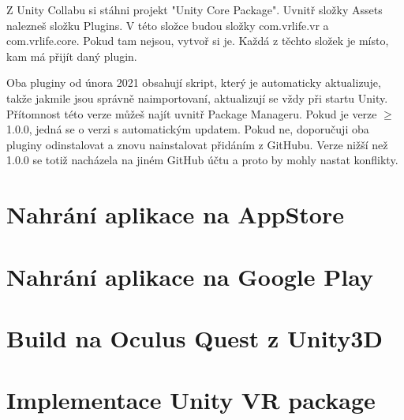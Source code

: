\documentclass{article}
\begin{document}
Z Unity Collabu si stáhni projekt "Unity Core Package". Uvnitř složky Assets nalezneš složku Plugins. V této složce budou složky com.vrlife.vr a com.vrlife.core. Pokud tam nejsou, vytvoř si je. Každá z těchto složek je místo, kam má přijít daný plugin.

Oba pluginy od února 2021 obsahují skript, který je automaticky aktualizuje, takže jakmile jsou správně naimportovaní, aktualizují se vždy při startu Unity. Přítomnost této verze můžeš najít uvnitř Package Manageru. Pokud je verze $\geq$ 1.0.0, jedná se o verzi s automatickým updatem. Pokud ne, doporučuji oba pluginy odinstalovat a znovu nainstalovat přidáním z GitHubu. Verze nižší než 1.0.0 se totiž nacházela na jiném GitHub účtu a proto by mohly nastat konflikty.

\pagebreak

\section{Nahrání aplikace na AppStore}
\pagebreak

\section{Nahrání aplikace na Google Play}
\pagebreak

\section{Build na Oculus Quest z Unity3D}
\pagebreak

\section{Implementace Unity VR package}
\pagebreak
\end{document}
